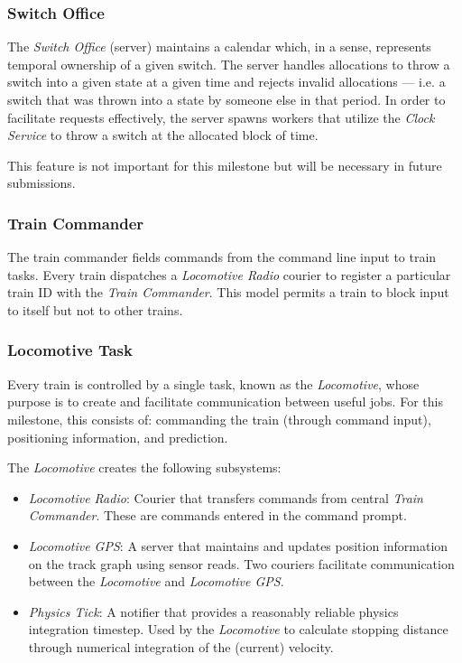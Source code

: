 \documentclass[twoside,a4paper]{refart}
\begin{document}
\subsubsection{Switch Office}
The \textit{Switch Office} (server) maintains a calendar which, in a sense, represents temporal ownership of a given switch. The server handles allocations to throw a switch into a given state at a given time and rejects invalid allocations --- i.e. a switch that was thrown into a state by someone else in that period. In order to facilitate requests effectively, the server spawns workers that utilize the \textit{Clock Service} to throw a switch at the allocated block of time.

This feature is not important for this milestone but will be necessary in future submissions.

\subsubsection{Train Commander}
\label{sec:traincommander}
The train commander fields commands from the command line input to train tasks. Every train dispatches a \textit{Locomotive Radio} courier to register a particular train ID with the \textit{Train Commander}. This model permits a train to block input to itself but not to other trains.

\subsubsection{Locomotive Task}
Every train is controlled by a single task, known as the \textit{Locomotive}, whose purpose is to create and facilitate communication between useful jobs. For this milestone, this consists of: commanding the train (through command input), positioning information, and prediction.

The \textit{Locomotive} creates the following subsystems:
\begin{itemize}
    \item{ \textit{Locomotive Radio}: Courier that transfers commands from central \textit{Train Commander}. These are commands entered in the command prompt.}
    \item{ \textit{Locomotive GPS}: A server that maintains and updates position information on the track graph using sensor reads. Two couriers facilitate communication between the \textit{Locomotive} and \textit{Locomotive GPS}. }
    \item{ \textit{Physics Tick}: A notifier that provides a reasonably reliable physics integration timestep. Used by the \textit{Locomotive} to calculate stopping distance through numerical integration of the (current) velocity. }
\end{itemize}
\end{document}
